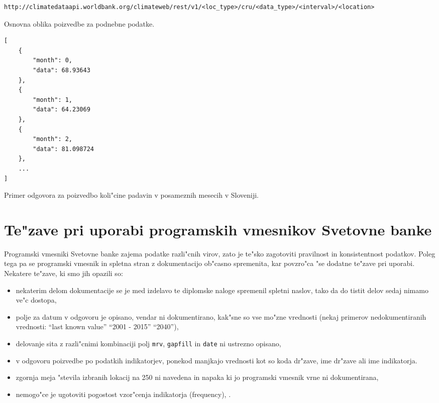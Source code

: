 \begin{snippet}
\begin{center}
\begin{lstlisting}
http://climatedataapi.worldbank.org/climateweb/rest/v1/<loc_type>/cru/<data_type>/<interval>/<location>
\end{lstlisting}
\end{center}
\caption{Osnovna oblika poizvedbe za podnebne podatke.}
\label{climate_dataset_request}
\end{snippet} 


\begin{snippet}
\begin{center}
\begin{lstlisting}
[
    {
        "month": 0,
        "data": 68.93643
    },
    {
        "month": 1,
        "data": 64.23069
    },
    {
        "month": 2,
        "data": 81.098724
    },
    ...
]
\end{lstlisting}
\end{center}
\caption{Primer odgovora za poizvedbo koli"cine padavin v posameznih mesecih v 
  Sloveniji.}
\label{climate_dataset_response}
\end{snippet} 











\section{Te"zave pri uporabi programskih vmesnikov Svetovne banke}


Programski vmesniki Svetovne banke zajema podatke razli"cnih virov, zato je
te"sko zagotoviti pravilnost in konsistentnost podatkov. Poleg tega pa se 
programski vmesnik in spletna stran z dokumentacijo ob"casno spremenita, kar
povzro"ca "se dodatne te"zave pri uporabi. Nekatere te"zave, ki smo jih opazili
so:
\begin{itemize}  
\item nekaterim delom dokumentacije se je med izdelavo te diplomske naloge
  spremenil spletni naslov, tako da do tistit delov sedaj nimamo ve"c dostopa,
\item polje za datum v odgovoru je opisano, vendar ni dokumentirano, kak"sne so
    vse mo"zne vrednosti (nekaj primerov nedokumentiranih vrednosti:
    ``last known value'' ``2001 - 2015'' ``2040''),
\item delovanje sita z razli"cnimi kombinaciji polj \verb|mrv|, \verb|gapfill|
  in \verb|date| ni ustrezno opisano,
\item v odgovoru poizvedbe po podatkih indikatorjev, ponekod manjkajo vrednosti
  kot so koda dr"zave, ime dr"zave ali ime indikatorja.
\item zgornja meja "stevila izbranih lokacij na 250 ni navedena in napaka 
  ki jo programski vmesnik vrne ni dokumentirana,
\item nemogo"ce je ugotoviti pogostost vzor"cenja indikatorja (frequency), .
\end{itemize}  







